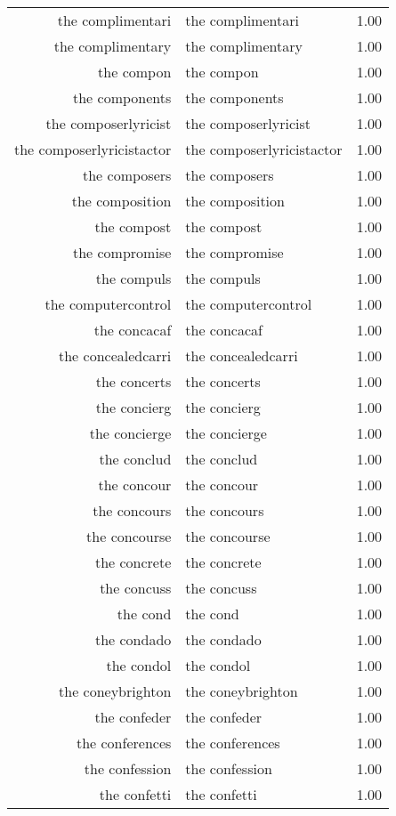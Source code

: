 \begin{table}[ht]
\begin{tabular}{rlr}
  the complimentari & the complimentari & 1.00 \\ 
  the complimentary & the complimentary & 1.00 \\ 
  the compon & the compon & 1.00 \\ 
  the components & the components & 1.00 \\ 
  the composerlyricist & the composerlyricist & 1.00 \\ 
  the composerlyricistactor & the composerlyricistactor & 1.00 \\ 
  the composers & the composers & 1.00 \\ 
  the composition & the composition & 1.00 \\ 
  the compost & the compost & 1.00 \\ 
  the compromise & the compromise & 1.00 \\ 
  the compuls & the compuls & 1.00 \\ 
  the computercontrol & the computercontrol & 1.00 \\ 
  the concacaf & the concacaf & 1.00 \\ 
  the concealedcarri & the concealedcarri & 1.00 \\ 
  the concerts & the concerts & 1.00 \\ 
  the concierg & the concierg & 1.00 \\ 
  the concierge & the concierge & 1.00 \\ 
  the conclud & the conclud & 1.00 \\ 
  the concour & the concour & 1.00 \\ 
  the concours & the concours & 1.00 \\ 
  the concourse & the concourse & 1.00 \\ 
  the concrete & the concrete & 1.00 \\ 
  the concuss & the concuss & 1.00 \\ 
  the cond & the cond & 1.00 \\ 
  the condado & the condado & 1.00 \\ 
  the condol & the condol & 1.00 \\ 
  the coneybrighton & the coneybrighton & 1.00 \\ 
  the confeder & the confeder & 1.00 \\ 
  the conferences & the conferences & 1.00 \\ 
  the confession & the confession & 1.00 \\ 
  the confetti & the confetti & 1.00 \\ 

\end{tabular}
\end{table}
